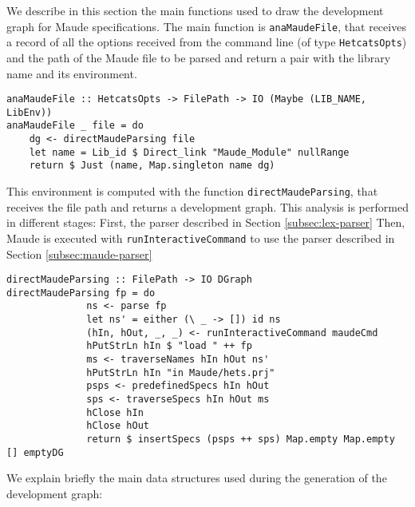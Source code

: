 
We describe in this section the main functions used to draw the
development graph for Maude specifications. The main function is
\verb"anaMaudeFile", that receives a record of all the options received
from the command line (of type \verb"HetcatsOpts") and the path of
the Maude file to be parsed and return a pair with the library
name and its environment.

{\codesize
\begin{verbatim}
anaMaudeFile :: HetcatsOpts -> FilePath -> IO (Maybe (LIB_NAME, LibEnv))
anaMaudeFile _ file = do
    dg <- directMaudeParsing file
    let name = Lib_id $ Direct_link "Maude_Module" nullRange
    return $ Just (name, Map.singleton name dg)
\end{verbatim}
}

This environment is computed with the function
\verb"directMaudeParsing", that receives the file path and returns
a development graph. This analysis is performed in different stages:
First, the parser described in Section \ref{subsec:lex-parser}
Then, Maude is executed with \verb"runInteractiveCommand" to use
the parser described in Section \ref{subsec:maude-parser}

{\codesize
\begin{verbatim}
directMaudeParsing :: FilePath -> IO DGraph
directMaudeParsing fp = do
              ns <- parse fp
              let ns' = either (\ _ -> []) id ns
              (hIn, hOut, _, _) <- runInteractiveCommand maudeCmd
              hPutStrLn hIn $ "load " ++ fp
              ms <- traverseNames hIn hOut ns'
              hPutStrLn hIn "in Maude/hets.prj"
              psps <- predefinedSpecs hIn hOut
              sps <- traverseSpecs hIn hOut ms
              hClose hIn
              hClose hOut
              return $ insertSpecs (psps ++ sps) Map.empty Map.empty [] emptyDG
\end{verbatim}
}

We explain briefly the main data structures used during the generation of
the development graph:

